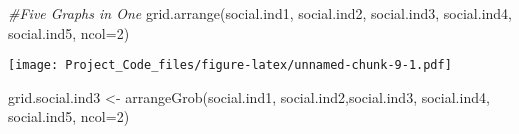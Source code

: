 \documentclass[
]{article}
\newenvironment{Shaded}{\begin{snugshade}}{\end{snugshade}}
\newcommand{\AttributeTok}[1]{\textcolor[rgb]{0.77,0.63,0.00}{#1}}
\newcommand{\CommentTok}[1]{\textcolor[rgb]{0.56,0.35,0.01}{\textit{#1}}}
\newcommand{\DecValTok}[1]{\textcolor[rgb]{0.00,0.00,0.81}{#1}}
\newcommand{\FunctionTok}[1]{\textcolor[rgb]{0.00,0.00,0.00}{#1}}
\newcommand{\NormalTok}[1]{#1}
\newcommand{\OtherTok}[1]{\textcolor[rgb]{0.56,0.35,0.01}{#1}}
\begin{document}
\begin{Shaded}
\begin{Highlighting}[]
\CommentTok{\#Five Graphs in One}
\FunctionTok{grid.arrange}\NormalTok{(social.ind1, social.ind2, social.ind3, social.ind4, social.ind5, }\AttributeTok{ncol=}\DecValTok{2}\NormalTok{)}
\end{Highlighting}
\end{Shaded}

\texttt{[image: Project\_Code\_files/figure-latex/unnamed-chunk-9-1.pdf]}

\begin{Shaded}
\begin{Highlighting}[]
\NormalTok{grid.social.ind3 }\OtherTok{\textless{}{-}} \FunctionTok{arrangeGrob}\NormalTok{(social.ind1, social.ind2,social.ind3, social.ind4, social.ind5, }\AttributeTok{ncol=}\DecValTok{2}\NormalTok{) }
\end{Highlighting}
\end{Shaded}
\end{document}
